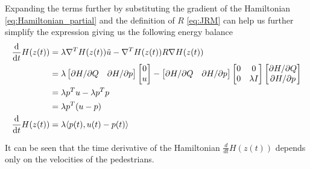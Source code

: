 Expanding the terms further by substituting the gradient of the Hamiltonian \autoref{eq:Hamiltonian_partial} and the definition of $R$ \autoref{eq:JRM} can help us further simplify the expression giving us the following energy balance
\begin{align}
    \dfrac{\mathrm d }{\mathrm d t}H(z(t)) &= \lambda \nabla^T H(z(t)) \tilde u - \nabla^T H(z(t)) R \nabla H(z(t)) \nonumber \\
    &\begin{aligned}
        &= \lambda 
        \begin{bmatrix}
        \partial H / \partial Q & \partial H / \partial p
        \end{bmatrix}
        \begin{bmatrix}
            0 \\
            u
        \end{bmatrix}
        - 
        \begin{bmatrix}
        \partial H / \partial Q & \partial H / \partial p
        \end{bmatrix}
        \begin{bmatrix}
            0 & 0 \\ 0 & \lambda I
        \end{bmatrix}
        \begin{bmatrix}
        \partial H / \partial Q \\ \partial H / \partial p
        \end{bmatrix}  \\ 
        &= \lambda p^T u - \lambda  p^T p \\ 
        &= \lambda p^T (u - p) \\ 
    \end{aligned} \nonumber \\
    \dfrac{\mathrm d }{\mathrm d t}H(z(t))&= \lambda \langle p(t),u(t)-p(t) \rangle
    \label{eq:dH}
\end{align}


It can be seen that the time derivative of the Hamiltonian $\frac{d}{dt}H(z(t))$ depends only on the velocities of the pedestrians.

